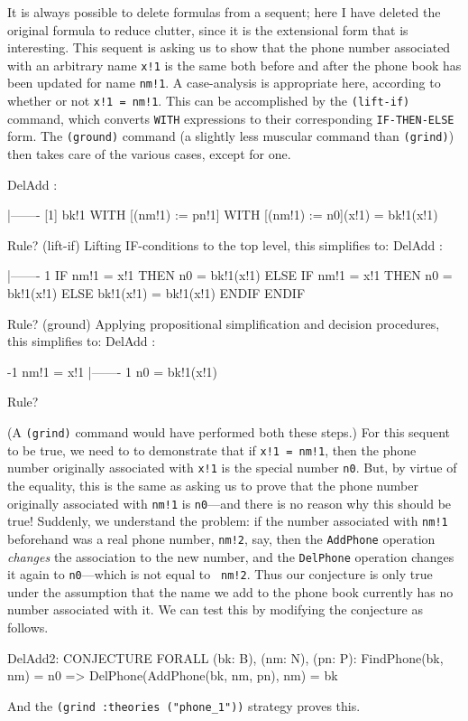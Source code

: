It is always possible to delete formulas from a sequent; here I have
deleted the original formula to reduce clutter, since it is the
extensional form that is interesting.  This sequent is asking us to
show that the phone number associated with an arbitrary name {\tt x!1}
is the same both before and after the phone book has been updated for
name {\tt nm!1}.  A case-analysis is appropriate here, according to
whether or not {\tt x!1 = nm!1}.  This can be accomplished by
the {\tt (lift-if)} command, which converts {\tt WITH} expressions to
their corresponding {\tt IF-THEN-ELSE} form.  The {\tt (ground)}
command (a slightly less muscular command than {\tt (grind)}) then
takes care of the various cases, except for one.
\begin{pvsexample}
DelAdd :  

  |-------
[1]   bk!1 WITH [(nm!1) := pn!1] WITH [(nm!1) := n0](x!1) = bk!1(x!1)

Rule? (lift-if)
Lifting IF-conditions to the top level,
this simplifies to: 
DelAdd :  

  |-------
{1}   IF nm!1 = x!1 THEN n0 = bk!1(x!1)
      ELSE IF nm!1 = x!1 THEN n0 = bk!1(x!1)
        ELSE bk!1(x!1) = bk!1(x!1)
        ENDIF
      ENDIF

Rule? (ground)
Applying propositional simplification and decision procedures,
this simplifies to: 
DelAdd :  

{-1}   nm!1 = x!1
  |-------
{1}   n0 = bk!1(x!1)

Rule?
\end{pvsexample}
(A {\tt (grind)} command would have performed both these steps.)
For this sequent to be true, we need to to demonstrate
that if {\tt x!1 = nm!1}, then the phone number originally associated
with {\tt x!1} is the special number {\tt n0}.  But, by virtue of the
equality, this is the same as asking us to prove that the phone number
originally associated with {\tt nm!1} is {\tt n0}---and there is no
reason why this should be true!  Suddenly, we understand the problem:
if the number associated with {\tt nm!1} beforehand was a real phone
number, {\tt nm!2}, say, then the {\tt AddPhone} operation {\em
changes\/} the association to the new number, and the {\tt DelPhone}
operation changes it again to {\tt n0}---which is not equal to {\tt
nm!2}.  Thus our conjecture is only true under the assumption that the
name we add to the phone book currently has no number associated with it.
We can test this by modifying the conjecture as follows.
\begin{pvsexample}
DelAdd2: CONJECTURE  FORALL (bk: B), (nm: N), (pn: P):
  FindPhone(bk, nm) = n0 => DelPhone(AddPhone(bk, nm, pn), nm) = bk
\end{pvsexample}
And the {\tt (grind :theories ("phone\_1"))} strategy proves this.

